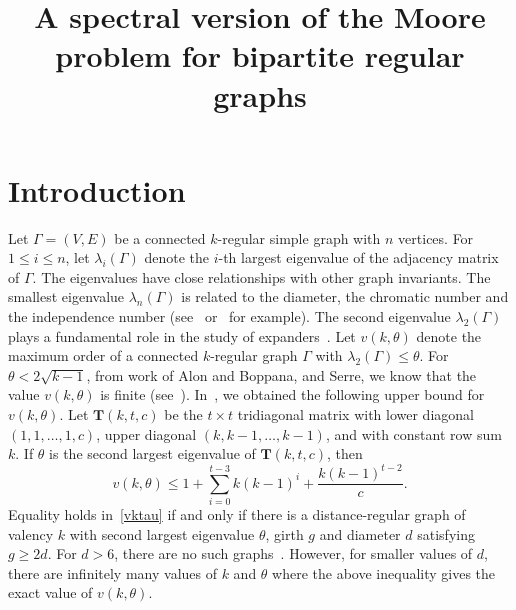 \documentclass[ALCO,ThmDefs,Unicode,epreuves]{cedram}
\author{\firstname{Sebastian} \middlename{M.} \lastname{Cioab\u{a}}} %
\author{\firstname{Jack} \middlename{H.} \lastname{Koolen}} %
\author[\initial{H.} Nozaki]{\firstname{Hiroshi} \lastname{Nozaki}} %
\title
[A spectral version of the Moore problem for bipartite regular graphs]
{A spectral version of the Moore problem for bipartite regular graphs}
\begin{document}
\maketitle

\section{Introduction}

Let $\Gamma=(V,E)$ be a connected $k$-regular simple graph with $n$ vertices. For $1\leq i\leq n$, let $\lambda_i(\Gamma)$ denote the $i$-th largest eigenvalue of the adjacency matrix of $\Gamma$. The eigenvalues have close relationships with other graph invariants. The smallest eigenvalue $\lambda_n(\Gamma)$ is related to the diameter, the chromatic number and the independence number (see~\cite[Chapter~4]{BH12} or~\cite{Ch89} for example). The second eigenvalue $\lambda_2(\Gamma)$ plays a fundamental role in the study of expanders~\cite{A86, AM85, BH12, HLW06}. Let $v(k,\theta)$ denote the maximum order of a connected $k$-regular graph $\Gamma$ with $\lambda_2(\Gamma) \leq \theta$. For $\theta < 2\sqrt{k-1}$, from work of Alon and Boppana, and Serre, we know that the value $v(k,\theta)$ is finite (see~\cite{CKNV16,MSS15}). In~\cite{CKNV16}, we obtained the following upper bound for $v(k,\theta)$. Let $\boldsymbol{T}(k,t,c)$ be the $t \times t$ tridiagonal matrix with lower diagonal $(1,1,\ldots,1,c)$, upper diagonal $(k,k-1,\ldots, k-1)$, and with constant row sum $k$. If $\theta$ is the second largest eigenvalue of $\boldsymbol{T}(k,t,c)$, then
\begin{equation}\label{vktau}
v(k,\theta) \leq 1+\sum_{i=0}^{t-3} k(k-1)^i+ \frac{k(k-1)^{t-2}}{c}. 
\end{equation}
Equality holds in~\eqref{vktau} if and only if there is a distance-regular graph of valency $k$ with second largest eigenvalue $\theta$, girth $g$ and diameter $d$ satisfying $g\geq 2d$. For $d>6$, there are no such graphs~\cite{DG81}. However, for smaller values of $d$, there are infinitely many values of $k$ and $\theta$ where the above inequality gives the exact value of $v(k,\theta)$. %
\end{document}
